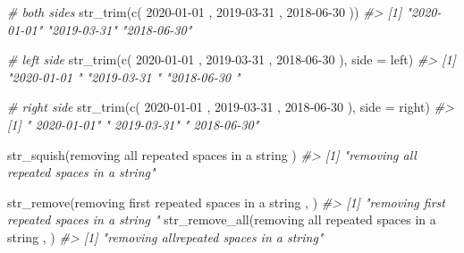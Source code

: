 \documentclass[
]{book}
\newenvironment{Shaded}{\begin{snugshade}}{\end{snugshade}}
\newcommand{\AttributeTok}[1]{\textcolor[rgb]{0.77,0.63,0.00}{#1}}
\newcommand{\CommentTok}[1]{\textcolor[rgb]{0.56,0.35,0.01}{\textit{#1}}}
\newcommand{\FunctionTok}[1]{\textcolor[rgb]{0.00,0.00,0.00}{#1}}
\newcommand{\NormalTok}[1]{#1}
\newcommand{\StringTok}[1]{\textcolor[rgb]{0.31,0.60,0.02}{#1}}
\begin{document}
\begin{Shaded}
\begin{Highlighting}[]
\CommentTok{\# both sides}
\FunctionTok{str\_trim}\NormalTok{(}\FunctionTok{c}\NormalTok{(}\StringTok{\textquotesingle{} 2020{-}01{-}01 \textquotesingle{}}\NormalTok{, }\StringTok{\textquotesingle{} 2019{-}03{-}31 \textquotesingle{}}\NormalTok{, }\StringTok{\textquotesingle{} 2018{-}06{-}30 \textquotesingle{}}\NormalTok{))}
\CommentTok{\#\textgreater{} [1] "2020{-}01{-}01" "2019{-}03{-}31" "2018{-}06{-}30"}

\CommentTok{\# left side}
\FunctionTok{str\_trim}\NormalTok{(}\FunctionTok{c}\NormalTok{(}\StringTok{\textquotesingle{} 2020{-}01{-}01 \textquotesingle{}}\NormalTok{, }\StringTok{\textquotesingle{} 2019{-}03{-}31 \textquotesingle{}}\NormalTok{, }\StringTok{\textquotesingle{} 2018{-}06{-}30 \textquotesingle{}}\NormalTok{), }\AttributeTok{side =} \StringTok{\textquotesingle{}left\textquotesingle{}}\NormalTok{)}
\CommentTok{\#\textgreater{} [1] "2020{-}01{-}01 " "2019{-}03{-}31 " "2018{-}06{-}30 "}

\CommentTok{\# right side}
\FunctionTok{str\_trim}\NormalTok{(}\FunctionTok{c}\NormalTok{(}\StringTok{\textquotesingle{} 2020{-}01{-}01 \textquotesingle{}}\NormalTok{, }\StringTok{\textquotesingle{} 2019{-}03{-}31 \textquotesingle{}}\NormalTok{, }\StringTok{\textquotesingle{} 2018{-}06{-}30 \textquotesingle{}}\NormalTok{), }\AttributeTok{side =} \StringTok{\textquotesingle{}right\textquotesingle{}}\NormalTok{)}
\CommentTok{\#\textgreater{} [1] " 2020{-}01{-}01" " 2019{-}03{-}31" " 2018{-}06{-}30"}

\FunctionTok{str\_squish}\NormalTok{(}\StringTok{\textquotesingle{}removing   all    repeated   spaces in a string  \textquotesingle{}}\NormalTok{)}
\CommentTok{\#\textgreater{} [1] "removing all repeated spaces in a string"}

\FunctionTok{str\_remove}\NormalTok{(}\StringTok{\textquotesingle{}removing   first  repeated   spaces in a string  \textquotesingle{}}\NormalTok{, }\StringTok{\textquotesingle{}  \textquotesingle{}}\NormalTok{)}
\CommentTok{\#\textgreater{} [1] "removing first  repeated   spaces in a string  "}
\FunctionTok{str\_remove\_all}\NormalTok{(}\StringTok{\textquotesingle{}removing   all  repeated   spaces in a string  \textquotesingle{}}\NormalTok{, }\StringTok{\textquotesingle{}  \textquotesingle{}}\NormalTok{)}
\CommentTok{\#\textgreater{} [1] "removing allrepeated spaces in a string"}
\end{Highlighting}
\end{Shaded}
\end{document}
